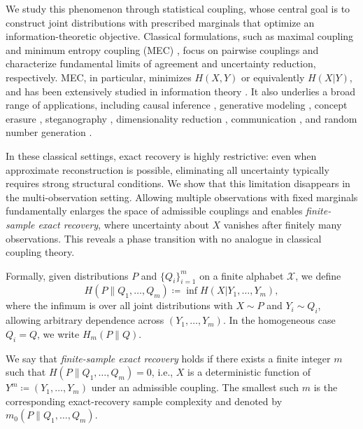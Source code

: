\documentclass[journal]{IEEEtran}
\def\calX{{\mathcal X}}
\newcommand{\1}{\mathbf{1}}
\begin{document}
We study this phenomenon through statistical coupling, whose central goal is to construct joint distributions with prescribed marginals that optimize an information-theoretic objective. Classical formulations, such as maximal coupling \cite{lindvall2002} and minimum entropy coupling (MEC) \cite{vidyasagar2012,cicalese2017isit,Cicalese_TIT}, focus on pairwise couplings and characterize fundamental limits of agreement and uncertainty reduction, respectively.
MEC, in particular, minimizes $H(X,Y)$ or equivalently $H(X| Y)$, and has been extensively studied in information theory \cite{EntropyCoupling_two_Sokota,EntropyCoupling_two_shkel,ebrahimi2024minimum,painsky2013memoryless,yu2018asymptotic,rossi2019greedy,kovacevic2015entropy}. It also underlies a broad range of applications, including causal inference \cite{kocaoglu2017entropic,kocaoglu2017isit,Javidian:21}, generative modeling \cite{bounoua2025learning}, concept erasure \cite{chowdhury2025fundamental}, steganography \cite{sokota2023perfectly}, dimensionality reduction \cite{cicalese2017minimum}, communication \cite{Sokota_Communication}, and random number generation \cite{li2020efficient}.

In these classical settings, exact recovery is highly restrictive: even when approximate reconstruction is possible, eliminating all uncertainty typically requires strong structural conditions. We show that this limitation disappears in the multi-observation setting. Allowing multiple observations with fixed marginals fundamentally enlarges the space of admissible couplings and enables \emph{finite-sample exact recovery}, where uncertainty about $X$ vanishes after finitely many observations. This reveals a phase transition with no analogue in classical coupling theory.

Formally, given distributions $P$ and $\{Q_i\}_{i=1}^m$ on a finite alphabet $\calX$, we define
$$
H(P\|Q_1,\ldots,Q_m)
\coloneqq \inf H(X|Y_1,\ldots,Y_m),
$$
where the infimum is over all joint distributions with $X\sim P$ and $Y_i\sim Q_i$, allowing arbitrary dependence across $(Y_1,\dots,Y_m)$. In the homogeneous case $Q_i=Q$, we write $H_m(P\|Q)$.

We say that \emph{finite-sample exact recovery} holds if there exists a finite integer $m$ such that $H(P\|Q_1,\ldots,Q_m)=0$, i.e., $X$ is a deterministic function of $Y^m\coloneqq (Y_1,\dots,Y_m)$ under an admissible coupling. The smallest such $m$ is the corresponding exact-recovery sample complexity and denoted by $m_0(P\|Q_1,\dots,Q_m)$.
\end{document}
